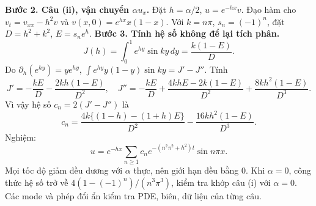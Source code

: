 \documentclass[10pt,a4paper]{article}
\begin{document}
\textbf{Bước 2. Câu (ii), vận chuyển $\alpha u_x$.}
Đặt $h=\alpha/2$, $u=e^{-hx}v$. Đạo hàm cho $v_t=v_{xx}-h^2v$ và $v(x,0)=e^{hx}x(1-x)$. Với $k=n\pi$, $s_n=(-1)^n$, đặt $D=h^2+k^2$, $E=s_ne^h$.
\textbf{Bước 3. Tính hệ số không để lại tích phân.}
\[J(h)=\int_0^1e^{hy}\sin ky\,dy=\frac{k(1-E)}D.\]
Do $\partial_h(e^{hy})=ye^{hy}$, $\int e^{hy}y(1-y)\sin ky=J'-J''$. Tính
\[J'=-\frac{kE}D-\frac{2kh(1-E)}{D^2},\quad
J''=-\frac{kE}D+\frac{4khE-2k(1-E)}{D^2}
+\frac{8kh^2(1-E)}{D^3}.\]
Vì vậy hệ số $c_n=2(J'-J'')$ là
\[c_n=\frac{4k\{(1-h)-(1+h)E\}}{D^2}
-\frac{16kh^2(1-E)}{D^3}.\]
Nghiệm:
\[u=e^{-hx}\sum_{n\ge1}c_ne^{-(n^2\pi^2+h^2)t}\sin n\pi x.\]
Mọi tốc độ giảm đều dương với $\alpha$ thực, nên giới hạn đều bằng $0$. Khi $\alpha=0$, công thức hệ số trở về $4(1-(-1)^n)/(n^3\pi^3)$, kiểm tra khớp câu (i) với $\alpha=0$. Các mode và phép đổi ẩn kiểm tra PDE, biên, dữ liệu của từng câu.
\end{document}

